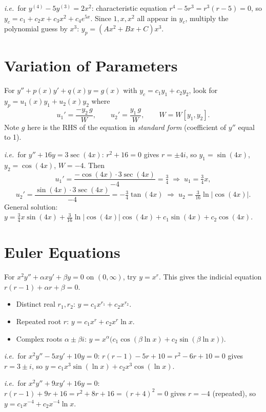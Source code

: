 \documentclass[11pt]{article}
\begin{document}
\textit{i.e.}\ for $y^{(4)} - 5y^{(3)} = 2x^2$: characteristic equation $r^4 - 5r^3 = r^3(r-5) = 0$, so $y_c = c_1 + c_2 x + c_3 x^2 + c_4 e^{5x}$. Since $1, x, x^2$ all appear in $y_c$, multiply the polynomial guess by $x^3$: $y_p = (Ax^2 + Bx + C)x^3$.
 
\section*{Variation of Parameters}
For $y'' + p(x)y' + q(x)y = g(x)$ with $y_c = c_1 y_1 + c_2 y_2$, look for $y_p = u_1(x)y_1 + u_2(x)y_2$ where
\[
u_1' = \frac{-y_2\, g}{W}, \qquad u_2' = \frac{y_1\, g}{W}, \qquad W = W[y_1, y_2].
\]
Note $g$ here is the RHS of the equation in \emph{standard form} (coefficient of $y''$ equal to 1).
 
\textit{i.e.}\ for $y'' + 16y = 3\sec(4x)$: $r^2 + 16 = 0$ gives $r = \pm 4i$, so $y_1 = \sin(4x)$, $y_2 = \cos(4x)$, $W = -4$. Then
\[
u_1' = \frac{-\cos(4x)\cdot 3\sec(4x)}{-4} = \tfrac{3}{4} \;\Rightarrow\; u_1 = \tfrac{3}{4}x,
\]
\[
u_2' = \frac{\sin(4x)\cdot 3\sec(4x)}{-4} = -\tfrac{3}{4}\tan(4x) \;\Rightarrow\; u_2 = \tfrac{3}{16}\ln|\cos(4x)|.
\]
General solution: $y = \tfrac{3}{4}x\sin(4x) + \tfrac{3}{16}\ln|\cos(4x)|\cos(4x) + c_1\sin(4x) + c_2\cos(4x)$.
 
\section*{Euler Equations}
For $x^2 y'' + \alpha x y' + \beta y = 0$ on $(0, \infty)$, try $y = x^r$. This gives the indicial equation $r(r-1) + \alpha r + \beta = 0$.
\begin{itemize}[leftmargin=*]
    \item Distinct real $r_1, r_2$: $y = c_1 x^{r_1} + c_2 x^{r_2}$.
    \item Repeated root $r$: $y = c_1 x^r + c_2 x^r \ln x$.
    \item Complex roots $\alpha \pm \beta i$: $y = x^\alpha\bigl(c_1\cos(\beta\ln x) + c_2\sin(\beta\ln x)\bigr)$.
\end{itemize}
 
\textit{i.e.}\ for $x^2 y'' - 5xy' + 10y = 0$: $r(r-1) - 5r + 10 = r^2 - 6r + 10 = 0$ gives $r = 3 \pm i$, so $y = c_1 x^3 \sin(\ln x) + c_2 x^3 \cos(\ln x)$.
 
\textit{i.e.}\ for $x^2 y'' + 9xy' + 16y = 0$: $r(r-1) + 9r + 16 = r^2 + 8r + 16 = (r+4)^2 = 0$ gives $r = -4$ (repeated), so $y = c_1 x^{-4} + c_2 x^{-4}\ln x$.
 
\end{document}
